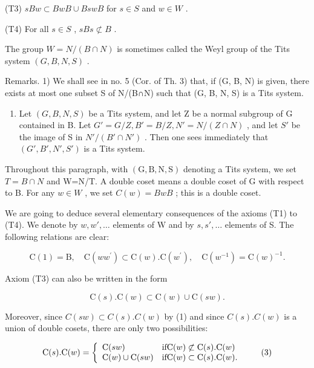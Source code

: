 (T3) \(sBw \subset BwB \cup BswB\) for \(s \in S\) and \(w \in W\) .

(T4) For all \(s \in S\) , \(sBs \not\subset B\) .

The group \(W = N / (B \cap N)\) is sometimes called the Weyl group of the Tits system \((G, B, N, S)\) .

Remarks. 1) We shall see in no. 5 (Cor. of Th. 3) that, if (G, B, N) is given, there exists at most one subset S of N/(B∩N) such that (G, B, N, S) is a Tits system.

\begin{enumerate}
\def\labelenumi{\arabic{enumi})}
\setcounter{enumi}{1}
\tightlist
\item
  Let \((G, B, N, S)\) be a Tits system, and let Z be a normal subgroup of G contained in B. Let \(G' = G/Z, B' = B/Z, N' = N/(Z \cap N)\) , and let \(S'\) be the image of S in \(N'/(B' \cap N')\) . Then one sees immediately that \((G', B', N', S')\) is a Tits system.
\end{enumerate}

Throughout this paragraph, with \((\mathrm{G},\mathrm{B},\mathrm{N},\mathrm{S})\) denoting a Tits system, we set \(T=B\cap N\) and W=N/T. A double coset means a double coset of G with respect to B. For any \(w\in W\) , we set \(C(w)=BwB\) ; this is a double coset.

We are going to deduce several elementary consequences of the axioms (T1) to (T4). We denote by \(w, w', \ldots\) elements of W and by \(s, s', \ldots\) elements of S. The following relations are clear:

\[
\mathrm{C} (1) = \mathrm{B}, \quad \mathrm{C} (w w ^ {\prime}) \subset \mathrm{C} (w). \mathrm{C} (w ^ {\prime}), \quad \mathrm{C} (w ^ {- 1}) = \mathrm{C} (w) ^ {- 1}.\tag{1}
\]

Axiom (T3) can also be written in the form

\[
\mathrm{C} (s). \mathrm{C} (w) \subset \mathrm{C} (w) \cup \mathrm{C} (s w).\tag{2}
\]

Moreover, since \(C(sw) \subset C(s).C(w)\) by (1) and since \(C(s).C(w)\) is a union of double cosets, there are only two possibilities:

\[
\mathrm{C} (s). \mathrm{C} (w) = \left\{ \begin{array}{l l} \mathrm{C} (s w) & \text {if} \mathrm{C} (w) \not \subset \mathrm{C} (s). \mathrm{C} (w) \\ \mathrm{C} (w) \cup \mathrm{C} (s w) & \text {if} \mathrm{C} (w) \subset \mathrm{C} (s). \mathrm{C} (w). \end{array} \right.\tag{3}
\]

